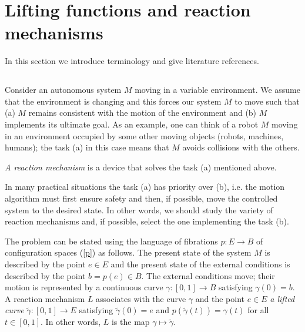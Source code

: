 \documentclass[11pt]{amsart}
\begin{document}

\section{Lifting functions and reaction mechanisms}\label{sec:2}

In this section we introduce terminology and give literature references. 

\subsection{} Consider an autonomous system $M$ moving in a variable environment. We assume that the environment is changing and this forces our system $M$ to move such that (a) $M$ remains consistent with the motion of the environment and (b) $M$ implements its ultimate goal. 
As an example, one can think of a robot $M$ moving in an environment occupied by some other moving objects (robots, machines, humans); the task (a)  in this case means that $M$ avoids collisions with the others. 


{\it A reaction mechanism} is a device that solves the task (a) mentioned above. 

In many practical situations the task (a) has priority over (b), i.e. the motion algorithm must first ensure safety and then, if possible, move the controlled system to the desired state. In other words, we should study the variety of reaction mechanisms and, if possible, select the one implementing the task (b). 

The problem can be stated 
using the language of fibrations $p:E\to B$ of configuration spaces (\ref{p}) as follows. The present state of the system $M$ is described by the point $e\in E$ and the present state of the external conditions is described by the point $b=p(e)\in B$. The external conditions move; their motion is represented by a continuous curve $\gamma: [0, 1]\to B$ satisfying $\gamma(0)=b$. A reaction mechanism $L$ associates with 
the curve $\gamma$ and the point $e\in E$ {\it a lifted curve} $\tilde \gamma: [0,1]\to E$ satisfying $\tilde \gamma(0)=e$ and $p(\tilde\gamma(t))=\gamma(t)$ for all $t\in [0,1]$. In other words, $L$ is the map $\gamma\mapsto \tilde \gamma$. 
\end{document}
